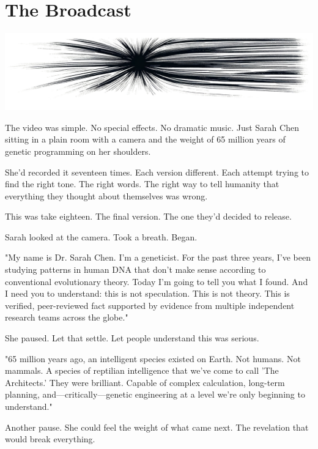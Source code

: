 \chapter{The Broadcast}
\label{ch:25}



\begin{center}
\includegraphics[width=\textwidth]{images/chapterImages/genesis_sketch_00122_.png}
\end{center}

The video was simple. No special effects. No dramatic music. Just Sarah Chen sitting in a plain room with a camera and the weight of 65 million years of genetic programming on her shoulders.

She'd recorded it seventeen times. Each version different. Each attempt trying to find the right tone. The right words. The right way to tell humanity that everything they thought about themselves was wrong.

This was take eighteen. The final version. The one they'd decided to release.

Sarah looked at the camera. Took a breath. Began.

"My name is Dr. Sarah Chen. I'm a geneticist. For the past three years, I've been studying patterns in human DNA that don't make sense according to conventional evolutionary theory. Today I'm going to tell you what I found. And I need you to understand: this is not speculation. This is not theory. This is verified, peer-reviewed fact supported by evidence from multiple independent research teams across the globe."

She paused. Let that settle. Let people understand this was serious.

"65 million years ago, an intelligent species existed on Earth. Not humans. Not mammals. A species of reptilian intelligence that we've come to call 'The Architects.' They were brilliant. Capable of complex calculation, long-term planning, and—critically—genetic engineering at a level we're only beginning to understand."

Another pause. She could feel the weight of what came next. The revelation that would break everything.

